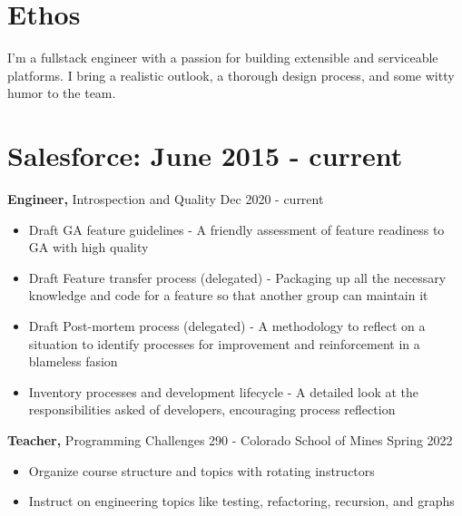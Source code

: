 \documentclass[12pt]{res}
\begin{document}

\address{{\bf Contact Information} \\ (720) 219-7914 \\ gik0geck0@gmail.com}
\address{{\bf Open Source} \\ https://github.com/gik0geck0 }

\begin{resume}

\section{Ethos}

I'm a fullstack engineer with a passion for building extensible and serviceable platforms. I bring a realistic outlook, a thorough design process, and some witty humor to the team.

\section{Salesforce: June 2015 - current}

{\bf Engineer,} Introspection and Quality \hfill Dec 2020 - current
\begin{itemize} \itemsep -2pt
    \item Draft GA feature guidelines - A friendly assessment of feature readiness to GA with high quality
    \item Draft Feature transfer process (delegated) - Packaging up all the necessary knowledge and code for a feature so that another group can maintain it
    \item Draft Post-mortem process (delegated) - A methodology to reflect on a situation to identify processes for improvement and reinforcement in a blameless fasion
    \item Inventory processes and development lifecycle - A detailed look at the responsibilities asked of developers, encouraging process reflection
\end{itemize}

{\bf Teacher,} Programming Challenges 290 - Colorado School of Mines \hfill Spring 2022
\begin{itemize} \itemsep -2pt
    \item Organize course structure and topics with rotating instructors
    \item Instruct on engineering topics like testing, refactoring, recursion, and graphs
\end{itemize}


\end{resume}
\end{document}

